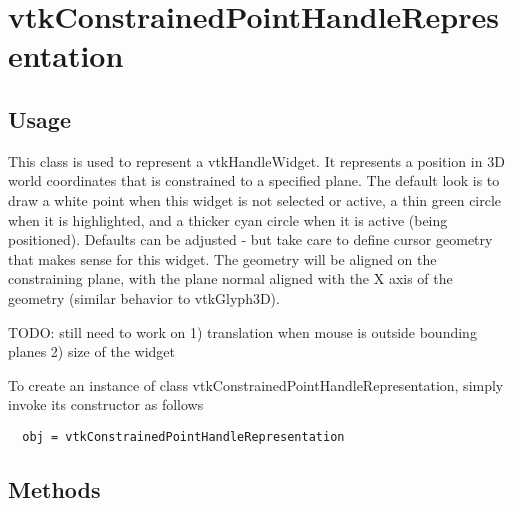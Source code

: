 \section{vtkConstrainedPointHandleRepresentation}

\subsection{Usage}

 This class is used to represent a vtkHandleWidget. It represents a
 position in 3D world coordinates that is constrained to a specified plane.
 The default look is to draw a white point when this widget is not selected
 or active, a thin green circle when it is highlighted, and a thicker cyan
 circle when it is active (being positioned). Defaults can be adjusted - but
 take care to define cursor geometry that makes sense for this widget.
 The geometry will be aligned on the constraining plane, with the plane
 normal aligned with the X axis of the geometry (similar behavior to
 vtkGlyph3D). 

 TODO: still need to work on 
 1) translation when mouse is outside bounding planes
 2) size of the widget


To create an instance of class vtkConstrainedPointHandleRepresentation, simply
invoke its constructor as follows
\begin{verbatim}
  obj = vtkConstrainedPointHandleRepresentation
\end{verbatim}
\subsection{Methods}

